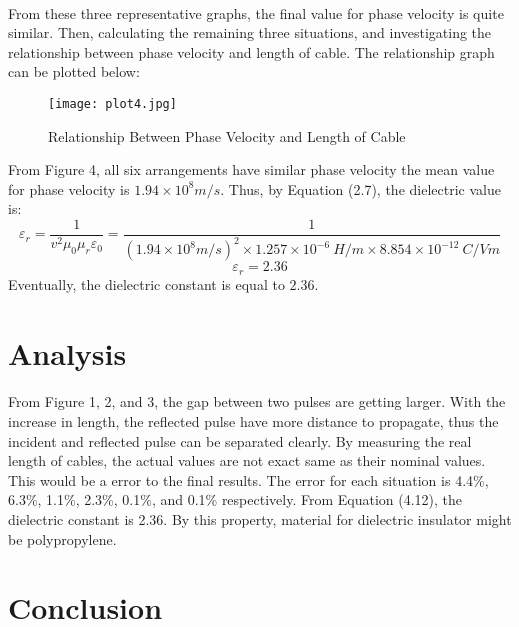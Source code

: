 \documentclass[12pt]{article}
\begin{document}
    \paragraph{}
    From these three representative graphs, the final value for phase velocity is quite similar. Then, calculating the remaining three situations, and investigating the relationship between phase velocity and length of cable. The relationship graph can be plotted below:
    \begin{figure}[H]
    \centering
    \texttt{[image: plot4.jpg]}
    \caption{Relationship Between Phase Velocity and Length of Cable}
    \end{figure}
    From Figure 4, all six arrangements have similar phase velocity the mean value for phase velocity is $1.94\times10^{8}m/s$. Thus, by Equation (2.7), the dielectric value is:
     \begin{equation}
        \varepsilon_{r}=\frac{1}{v^2\mu_{0}\mu_{r}\varepsilon_{0}}=\frac{1}{(1.94\times10^{8}m/s)^2\times1.257\times10^{-6}\ H/m\times8.854 \times 10^{-12} \ C/V m}
    \end{equation}
    \begin{equation}
        \varepsilon_{r}=2.36
    \end{equation}
    Eventually, the dielectric constant is equal to $2.36$.

    
    \section{Analysis}
    \paragraph{}
    From Figure 1, 2, and 3, the gap between two pulses are getting larger. With the increase in length, the reflected pulse have more distance to propagate, thus the incident and reflected pulse can be separated clearly. By measuring the real length of cables, the actual values are not exact same as their nominal values. This would be a error to the final results. The error for each situation is 4.4\%, 6.3\%, 1.1\%, 2.3\%, 0.1\%, and 0.1\% respectively. From Equation (4.12), the dielectric constant is 2.36. By this property, material for dielectric insulator might be polypropylene\cite{3}.
    
    
    
    
    
    
    
    \section{Conclusion}
\end{document}
